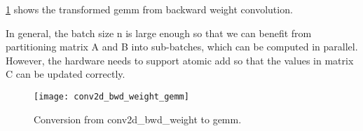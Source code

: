
\Fig \ref{fig:conv2d_bwd_weight_gemm} shows the transformed gemm from backward weight
convolution.

In general, the batch size n is large enough so that we can benefit from partitioning
matrix A and B into sub-batches, which can be computed in parallel.
However, the hardware needs to support atomic add so that the values in matrix C
can be updated correctly.

{}
\begin{figure}[!h]
  \centering
  \texttt{[image: conv2d\_bwd\_weight\_gemm]}





  \caption{Conversion from conv2d\_bwd\_weight to gemm.}
  \label{fig:conv2d_bwd_weight_gemm}
\end{figure}

